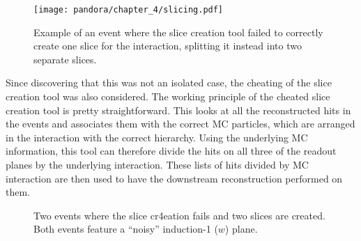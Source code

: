 \begin{figure}[!htb]
    \centering
    \texttt{[image: pandora/chapter\_4/slicing.pdf]}
    \caption[Slice creation failure mode]{Example of an event where the slice creation tool failed to correctly create one slice for the interaction, splitting it instead into two separate slices. }
    \label{fig:slicingIssue}
\end{figure}

Since discovering that this was not an isolated case, the cheating of the slice creation tool was also considered. The working principle of the cheated slice creation tool is pretty straightforward. This looks at all the reconstructed hits in the events and associates them with the correct MC particles, which are arranged in the interaction with the correct hierarchy. Using the underlying MC information, this tool can therefore divide the hits on all three of the readout planes by the underlying interaction. These lists of hits divided by MC interaction are then used to have the downstream reconstruction performed on them. 

\begin{figure}
    \centering
    
    \caption[Examples of issues with the slice creation]{Two events where the slice cr4eation fails and two slices are created. Both events feature a ``noisy'' induction-1 ($w$) plane. }
    \label{fig:sliceIssue}
\end{figure}